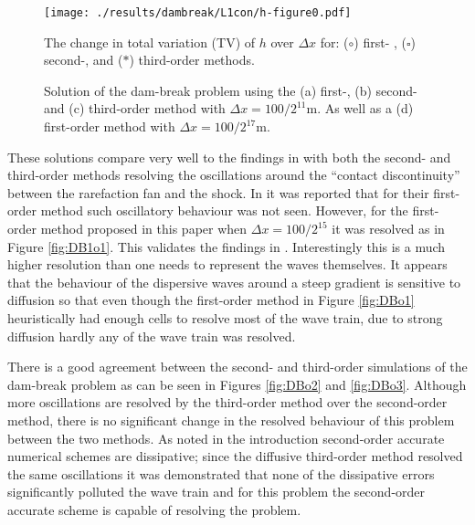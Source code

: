 \documentclass[SingleSpace,12pt,Proceedings]{Serre_ASCE}
\begin{document}
\begin{figure}
\begin{center}
\texttt{[image: ./results/dambreak/L1con/h-figure0.pdf]}
\end{center}
\caption{The change in total variation (TV) of $h$ over $\Delta x$ for: ($\circ$) first- , ($\square$) second-, and ($*$) third-order methods.}
\label{fig:DBL1}
\end{figure}
\begin{figure}
\centering
{}
\caption{Solution of the dam-break problem using the (a) first-, (b) second- and (c) third-order method with $\Delta x = 100 /2^{11} \text{m}$. As well as a (d) first-order method with $\Delta x = 100 /2^{17} \text{m}$. }
\label{fig:DB}
\end{figure}

These solutions compare very well to the findings in  with both the second- and third-order methods resolving the oscillations around the ``contact discontinuity''\cite{El-etal-2006} between the rarefaction fan and the shock. In  it was reported that for their first-order method such oscillatory behaviour was not seen. However, for the first-order method proposed in this paper when $\Delta x = 100 /2^{15}$ it was resolved as in Figure \ref{fig:DB1o1}. This validates the findings in . Interestingly this is a much higher resolution than one needs to represent the waves themselves. It appears that the behaviour of the dispersive waves around a steep gradient is sensitive to diffusion so that even though the first-order method in Figure \ref{fig:DBo1} heuristically had enough cells to resolve most of the wave train, due to strong diffusion hardly any of the wave train was resolved. 

There is a good agreement between the second- and third-order simulations of the dam-break problem as can be seen in Figures \ref{fig:DBo2} and \ref{fig:DBo3}. Although more oscillations are resolved by the third-order method over the second-order method, there is no significant change in the resolved behaviour of this problem between the two methods. As noted in the introduction second-order accurate numerical schemes are dissipative; since the diffusive third-order method resolved the same oscillations it was demonstrated that none of the dissipative errors significantly polluted the wave train and for this problem the second-order accurate scheme is capable of resolving the problem.
\end{document}
